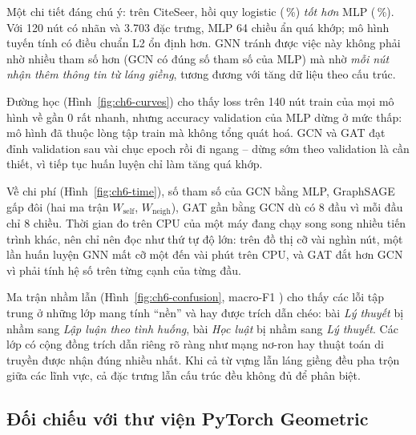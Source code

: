 Một chi tiết đáng chú ý: trên CiteSeer, hồi quy logistic (\,\%) \emph{tốt hơn}
MLP (\,\%). Với 120 nút có nhãn và 3.703 đặc trưng, MLP 64 chiều ẩn quá khớp; mô
hình tuyến tính có điều chuẩn L2 ổn định hơn. GNN tránh được việc này không phải nhờ nhiều tham số hơn (GCN có đúng số
tham số của MLP) mà nhờ \emph{mỗi nút nhận thêm thông tin từ láng giềng}, tương đương với tăng dữ liệu theo cấu trúc.


Đường học (Hình~\ref{fig:ch6-curves}) cho thấy loss trên 140 nút train của mọi mô hình về gần 0 rất nhanh, nhưng accuracy
validation của MLP dừng ở mức thấp: mô hình đã thuộc lòng tập train mà không tổng quát hoá. GCN và GAT đạt đỉnh validation
sau vài chục epoch rồi đi ngang -- dừng sớm theo validation là cần thiết, vì tiếp tục huấn luyện chỉ làm tăng quá khớp.


Về chi phí (Hình~\ref{fig:ch6-time}), số tham số của GCN bằng MLP, GraphSAGE gấp đôi (hai ma trận $W_{\text{self}}$,
$W_{\text{neigh}}$), GAT gần bằng GCN dù có 8 đầu vì mỗi đầu chỉ 8 chiều. Thời gian đo trên CPU của một máy đang chạy song
song nhiều tiến trình khác, nên chỉ nên đọc như thứ tự độ lớn: trên đồ thị cỡ vài nghìn nút, một lần huấn luyện GNN mất
cỡ một đến vài phút trên CPU, và GAT đắt hơn GCN vì phải tính hệ số trên từng cạnh của từng đầu.


Ma trận nhầm lẫn (Hình~\ref{fig:ch6-confusion}, macro-F1 ) cho thấy các lỗi tập trung
ở những lớp mang tính ``nền'' và hay được trích dẫn chéo: bài \emph{Lý thuyết} bị nhầm sang \emph{Lập luận theo tình
huống}, bài \emph{Học luật} bị nhầm sang \emph{Lý thuyết}. Các lớp có cộng đồng trích dẫn riêng rõ ràng như mạng nơ-ron
hay thuật toán di truyền được nhận đúng nhiều nhất. Khi cả từ vựng lẫn láng giềng đều pha trộn giữa các lĩnh vực, cả đặc
trưng lẫn cấu trúc đều không đủ để phân biệt.

\subsection{Đối chiếu với thư viện PyTorch Geometric}

